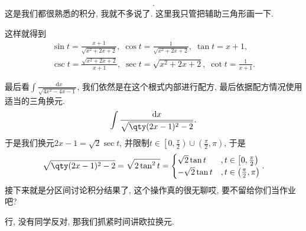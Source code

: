 \documentclass{ctexbook}
\newcommand*{\dif}{\mathop{}\!\mathrm{d}}
\begin{document}
{\begin{align*}
.\end{align*}
这是我们都很熟悉的积分, 我就不多说了. 这里我只管把辅助三角形画一下. 
\begin{center}
\end{center}
这样就得到
\begin{align*}
\sin{t}=\frac{x+1}{\sqrt{x^{2}+2x+2}},\;\cos{t}=\frac{1}{\sqrt{x^{2}+2x+2}},\;\tan{t}=x+1,\\
\csc{t}=\frac{\sqrt{x^{2}+2x+2}}{x+1},\;\sec{t}=\sqrt{x^{2}+2x+2},\;\cot{t}=\frac{1}{x+1}
.\end{align*}\par
最后看$\int\frac{\dif{x}}{\sqrt{4x^{2}-4x-1}}$, 我们依然是在这个根式内部进行配方, 最后依据配方情况使用适当的三角换元. 
\begin{align*}
\int\frac{\dif{x}}{\sqrt{\qty(2x-1)^{2}-2}}
.\end{align*}
于是我们换元$2x-1=\sqrt{2}\sec{t}$, 并限制$t\in\left[0,\frac{\pi}{2}\right)\cup\left(\frac{\pi}{2},\pi\right)$, 于是
\begin{align*}
\sqrt{\qty(2x-1)^{2}-2}=\sqrt{2\tan^{2}{t}}=\begin{cases}
\sqrt{2}\tan{t}&,t\in\left[0,\frac{\pi}{2}\right)\\
-\sqrt{2}\tan{t}&,t\in\left(\frac{\pi}{2},\pi\right)
\end{cases}
.\end{align*}
接下来就是分区间讨论积分结果了, 这个操作真的很无聊哎, 要不留给你们当作业吧? \par
行, 没有同学反对, 那我们抓紧时间讲欧拉换元. \par
}
\end{document}
